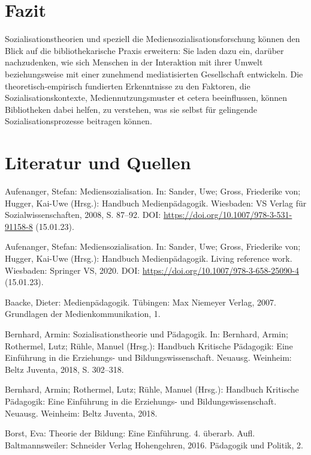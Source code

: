 \documentclass[a4paper,
fontsize=11pt,
oneside,
numbers=noperiodatend,
parskip=half-,
bibliography=totoc,
final
]{scrartcl}
\begin{document}
\hypertarget{fazit}{%
\section{Fazit}\label{fazit}}

Sozialisationstheorien und speziell die Mediensozialisationsforschung
können den Blick auf die bibliothekarische Praxis erweitern: Sie laden
dazu ein, darüber nachzudenken, wie sich Menschen in der Interaktion mit
ihrer Umwelt beziehungsweise mit einer zunehmend mediatisierten
Gesellschaft entwickeln. Die theoretisch-empirisch fundierten
Erkenntnisse zu den Faktoren, die Sozialisationskontexte,
Mediennutzungsmuster et cetera beeinflussen, können Bibliotheken dabei
helfen, zu verstehen, was sie selbst für gelingende
Sozialisationsprozesse beitragen können.

\hypertarget{literatur-und-quellen}{%
\section{Literatur und Quellen}\label{literatur-und-quellen}}

Aufenanger, Stefan: Mediensozialisation. In: Sander, Uwe; Gross,
Friederike von; Hugger, Kai-Uwe (Hrsg.): Handbuch Medienpädagogik.
Wiesbaden: VS Verlag für Sozialwissenschaften, 2008, S. 87--92. DOI:
\url{https://doi.org/10.1007/978-3-531-91158-8} (15.01.23).

Aufenanger, Stefan: Mediensozialisation. In: Sander, Uwe; Gross,
Friederike von; Hugger, Kai-Uwe (Hrsg.): Handbuch Medienpädagogik.
Living reference work. Wiesbaden: Springer VS, 2020. DOI:
\url{https://doi.org/10.1007/978-3-658-25090-4} (15.01.23).

Baacke, Dieter: Medienpädagogik. Tübingen: Max Niemeyer Verlag, 2007.
Grundlagen der Medienkommunikation, 1.

Bernhard, Armin: Sozialisationstheorie und Pädagogik. In: Bernhard,
Armin; Rothermel, Lutz; Rühle, Manuel (Hrsg.): Handbuch Kritische
Pädagogik: Eine Einführung in die Erziehungs- und Bildungswissenschaft.
Neuausg. Weinheim: Beltz Juventa, 2018, S. 302--318.

Bernhard, Armin; Rothermel, Lutz; Rühle, Manuel (Hrsg.): Handbuch
Kritische Pädagogik: Eine Einführung in die Erziehungs- und
Bildungswissenschaft. Neuausg. Weinheim: Beltz Juventa, 2018.

Borst, Eva: Theorie der Bildung: Eine Einführung. 4. überarb. Aufl.
Baltmannsweiler: Schneider Verlag Hohengehren, 2016. Pädagogik und
Politik, 2.
\end{document}
